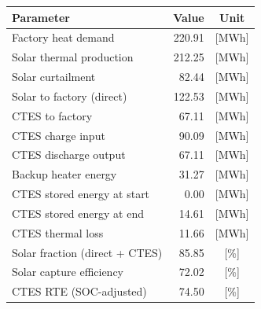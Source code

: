 \renewcommand{\arraystretch}{1.2}
\begin{table}[h]
\centering
\begin{tabular}{l|r c}
\hline
Parameter & Value & Unit \\
\hline
Factory heat demand & 220.91 & [MWh] \\
Solar thermal production & 212.25 & [MWh] \\
Solar curtailment & 82.44 & [MWh] \\
Solar to factory (direct) & 122.53 & [MWh] \\
CTES to factory & 67.11 & [MWh] \\
CTES charge input & 90.09 & [MWh] \\
CTES discharge output & 67.11 & [MWh] \\
Backup heater energy & 31.27 & [MWh] \\
CTES stored energy at start & 0.00 & [MWh] \\
CTES stored energy at end & 14.61 & [MWh] \\
CTES thermal loss & 11.66 & [MWh] \\
\hline
Solar fraction (direct + CTES) & 85.85 & [\%] \\
Solar capture efficiency & 72.02 & [\%] \\
CTES RTE (SOC-adjusted) & 74.50 & [\%] \\
\hline
\end{tabular}
\end{table}
